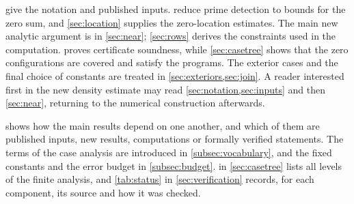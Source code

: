 \documentclass[11pt]{amsart}
\numberwithin{equation}{section}
\theoremstyle{plain}
\theoremstyle{definition}
\theoremstyle{remark}
\newcommand{\1}{\mathbf{1}}
\begin{document}
 give the notation and published inputs.
 reduce prime detection to bounds for the zero sum,
and \cref{sec:location} supplies the zero-location estimates. The main new analytic
argument is in \cref{sec:near}; \cref{sec:rows} derives the constraints used in the
computation.  proves certificate soundness, while \cref{sec:casetree} shows
that the zero configurations are covered and satisfy the programs. The exterior cases
and the final choice of constants are treated in \cref{sec:exteriors,sec:join}.
A reader interested first in the new density estimate may read \cref{sec:notation,sec:inputs}
and then \cref{sec:near}, returning to the numerical construction afterwards.

 shows how the main results depend on one another, and which of them are
published inputs, new results, computations or formally verified statements. The terms of the
case analysis are introduced in \cref{subsec:vocabulary}, and the fixed constants and the error
budget in \cref{subsec:budget}.  in \cref{sec:casetree} lists all levels of the
finite analysis, and \cref{tab:status} in \cref{sec:verification} records, for each component,
its source and how it was checked.
\end{document}
